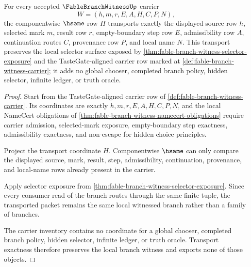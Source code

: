 \begin{theorem}
\label{thm:fable-branch-witness-local-transport}
For every accepted $\FableBranchWitnessUp$ carrier
$$
W=(h,m,r,E,A,H,C,P,N),
$$
the componentwise $\hsame$ row $H$ transports exactly the displayed source row $h$, selected mark $m$, result row $r$, empty-boundary step row $E$, admissibility row $A$, continuation routes $C$, provenance row $P$, and local name $N$. This transport preserves the local selector surface exposed by \autoref{thm:fable-branch-witness-selector-exposure} and the TasteGate-aligned carrier row marked at \autoref{def:fable-branch-witness-carrier}; it adds no global chooser, completed branch policy, hidden selector, infinite ledger, or truth oracle.
\end{theorem}
\begin{proof}
Start from the TasteGate-aligned carrier row of \autoref{def:fable-branch-witness-carrier}. Its coordinates are exactly $h,m,r,E,A,H,C,P,N$, and the local NameCert obligations of \autoref{thm:fable-branch-witness-namecert-obligations} require carrier admission, selected-mark exposure, empty-boundary step exactness, admissibility exactness, and non-escape for hidden choice principles.

Project the transport coordinate $H$. Componentwise $\hsame$ can only compare the displayed source, mark, result, step, admissibility, continuation, provenance, and local-name rows already present in the carrier.

Apply selector exposure from \autoref{thm:fable-branch-witness-selector-exposure}. Since every consumer read of the branch routes through the same finite tuple, the transported packet remains the same local witnessed branch rather than a family of branches.

The carrier inventory contains no coordinate for a global chooser, completed branch policy, hidden selector, infinite ledger, or truth oracle. Transport exactness therefore preserves the local branch witness and exports none of those objects.
\end{proof}

